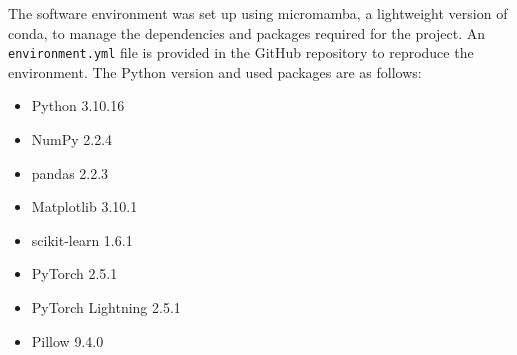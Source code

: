     The software environment was set up using micromamba, a lightweight version of conda, to manage the dependencies and packages required for the project.
    An \texttt{environment.yml} file is provided in the GitHub repository to reproduce the environment.
    The Python version and used packages are as follows:

    \begin{itemize}
        \item Python 3.10.16
        \item NumPy 2.2.4
        \item pandas 2.2.3
        \item Matplotlib 3.10.1
        \item scikit-learn 1.6.1
        \item PyTorch 2.5.1
        \item PyTorch Lightning 2.5.1
        \item Pillow 9.4.0
    \end{itemize}
